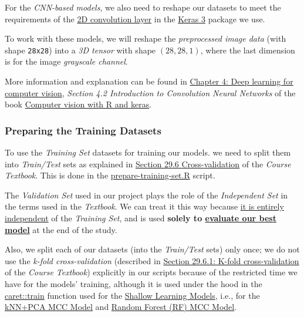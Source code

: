 \documentclass[
]{report}
\begin{document}
\begin{noteblock}
For the \emph{CNN-based models}, we also need to reshape our datasets to meet the requirements of the \href{https://keras3.posit.co/reference/layer_conv_2d.html}{2D convolution layer} in the \href{https://keras3.posit.co/}{Keras 3} package we use.

To work with these models, we will reshape the \emph{preprocessed image data} (with shape \texttt{28x28}) into a \emph{3D tensor} with shape \((28, 28, 1)\), where the last dimension is for the image \emph{grayscale channel}.

More information and explanation can be found in \href{https://s-ai-f.github.io/Computer-vision-keras-R/}{Chapter 4: Deep learning for computer vision}, \emph{Section 4.2 Introduction to Convolution Neural Networks} of the book \href{https://s-ai-f.github.io/Computer-vision-keras-R/}{Computer vision with R and keras}.

\end{noteblock}

\subsubsection{Preparing the Training Datasets}\label{preparing-the-training-datasets}

To use the \emph{Training Set} datasets for training our models. we need to split them into \emph{Train/Test} sets as explained in \href{https://rafalab.dfci.harvard.edu/dsbook-part-2/ml/resampling-methods.html\#cross-validation}{Section 29.6 Cross-validation} of the \emph{Course Textbook}. This is done in the \href{https://github.com/AzKurban-edX-DS/edx.capstone.choose-your-own/blob/main/r/support-scripts/prepare-training-set.R}{prepare-training-set.R} script.

\begin{noteblock}
The \emph{Validation Set} used in our project plays the role of the \emph{Independent Set} in the terms used in the \emph{Textbook}\autocite{IDS2_29.6}. We can treat it this way because \underline{it is entirely independent} of the \emph{Training Set}, and is used \textbf{solely to \underline{evaluate our best model}} at the end of the study.

Also, we split each of our datasets (into the \emph{Train/Test} sets) only once; we do not use the \emph{k-fold cross-validation} (described in \href{https://rafalab.dfci.harvard.edu/dsbook-part-2/ml/resampling-methods.html\#k-fold-cross-validation}{Section 29.6.1: K-fold cross-validation} of the \emph{Course Textbook}\autocite{IDS2_29.6.1}) explicitly in our scripts because of the restricted time we have for the models' training, although it is used under the hood in the \href{https://topepo.github.io/caret/model-training-and-tuning.html}{caret::train} function used for the \hyperref[shallow-learning-models]{Shallow Learning Models}, i.e., for the \hyperref[knn_pca_model]{kNN+PCA MCC Model} and \hyperref[rf_model]{Random Forest (RF) MCC Model}.

\end{noteblock}
\end{document}
